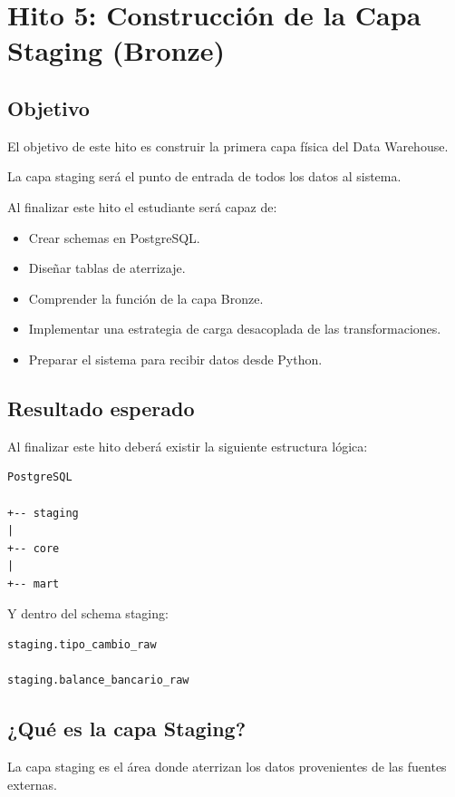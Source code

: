 \chapter{Hito 5: Construcción de la Capa Staging (Bronze)}

\section{Objetivo}

El objetivo de este hito es construir la primera capa física del Data Warehouse.

La capa staging será el punto de entrada de todos los datos al sistema.

Al finalizar este hito el estudiante será capaz de:

\begin{itemize}
\item Crear schemas en PostgreSQL.
\item Diseñar tablas de aterrizaje.
\item Comprender la función de la capa Bronze.
\item Implementar una estrategia de carga desacoplada de las transformaciones.
\item Preparar el sistema para recibir datos desde Python.
\end{itemize}

\section{Resultado esperado}

Al finalizar este hito deberá existir la siguiente estructura lógica:

\begin{verbatim}
PostgreSQL

+-- staging
|
+-- core
|
+-- mart
\end{verbatim}

Y dentro del schema staging:

\begin{verbatim}
staging.tipo_cambio_raw

staging.balance_bancario_raw
\end{verbatim}

\section{¿Qué es la capa Staging?}

La capa staging es el área donde aterrizan los datos provenientes de las fuentes externas.

